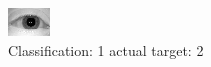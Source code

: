 \begin{figure}[h!]
\begin{center}
\includegraphics[width=0.60\columnwidth]{figures/ID925_class_1_target_2.png}
\end{center}
\caption{ Classification: 1 actual target: 2}
\label{fig:ID925_class_1_target_2}
\end{figure}
